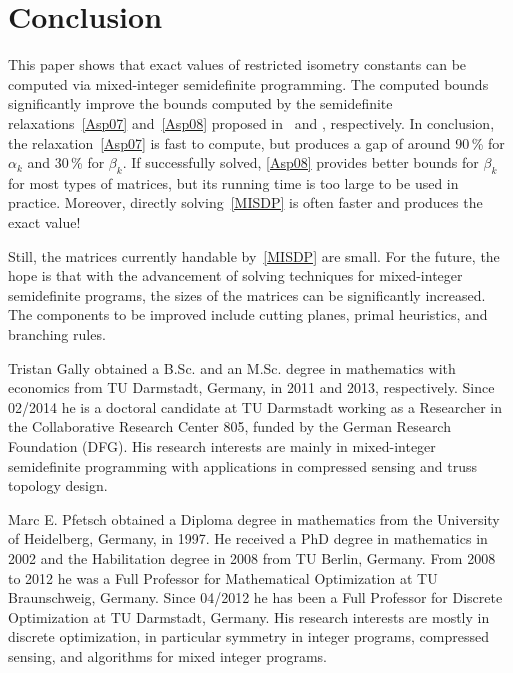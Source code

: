 \documentclass[journal]{IEEEtran}
\begin{document}


\section{Conclusion}

\noindent
This paper shows that exact values of restricted isometry constants can be
computed via mixed-integer semidefinite programming. The computed bounds
significantly improve the bounds computed by the semidefinite
relaxations~\eqref{Asp07} and~\eqref{Asp08}
proposed in~\cite{Asp07} and \cite{Asp08}, respectively. In conclusion, the
relaxation~\eqref{Asp07}
is fast to compute, but produces a gap of around 90\,\% for
$\alpha_k$ and 30\,\% for $\beta_k$. If successfully solved, 
\eqref{Asp08} provides better bounds for $\beta_k$ for most types of 
matrices, but its running time is too large
to be used in practice. Moreover, directly solving~\eqref{MISDP} is often
faster and produces the exact value!

Still, the matrices currently handable by~\eqref{MISDP} are small. For the
future, the hope is that with the advancement of solving techniques for
mixed-integer semidefinite programs, the sizes of the matrices can be
significantly increased. The components to be improved include cutting
planes, primal heuristics, and branching rules.




\begin{IEEEbiographynophoto}{Tristan Gally}
obtained a B.Sc. and an M.Sc. degree in mathematics with economics
from TU Darmstadt, Germany, in 2011 and 2013, respectively. Since
02/2014 he is a doctoral candidate at TU Darmstadt working as a
Researcher in the Collaborative Research Center 805, funded by the
German Research Foundation (DFG). His research interests are mainly
in mixed-integer semidefinite programming with applications in
compressed sensing and truss topology design.
\end{IEEEbiographynophoto}

\begin{IEEEbiographynophoto}{Marc E. Pfetsch}
  obtained a Diploma degree in mathematics from the University of
  Heidelberg, Germany, in 1997. He received a PhD degree in
  mathematics in 2002 and the Habilitation degree in 2008 from TU
  Berlin, Germany. From 2008 to 2012 he was a Full Professor for
  Mathematical Optimization at TU Braunschweig, Germany. Since 04/2012
  he has been a Full Professor for Discrete Optimization at TU
  Darmstadt, Germany. His research interests are mostly in discrete
  optimization, in particular symmetry in integer programs, compressed
  sensing, and algorithms for mixed integer programs.
\end{IEEEbiographynophoto}

\newpage
\appendix{}
\end{document}
